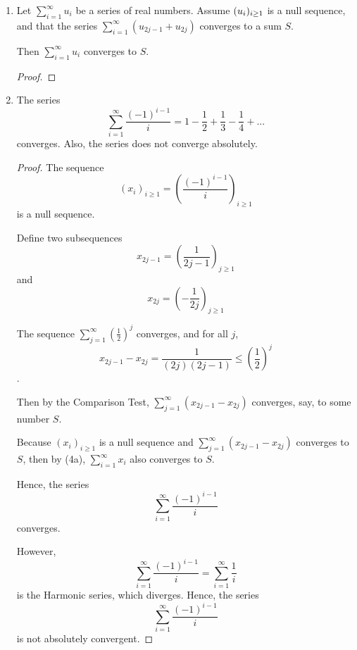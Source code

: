 \documentclass[12pt, letterpaper]{article}
\begin{document}
\begin{enumerate}[label=\bfseries2\alph*)]

\item Let $\sum_{i=1}^{\infty} u_i$ be a series of real numbers. Assume 
$(u_i)_{i \geq 1}$ is a null sequence, and that the series $\sum_{i=1}^{\infty} (u_{2j-1} + u_{2j})$
converges to a sum $S$.

Then $\sum_{i=1}^{\infty} u_i$ converges to $S$.

\begin{proof}
	
	

\end{proof}

\item The series \[\sum_{i=1}^{\infty} \frac{(-1)^{i-1}}{i} = 1 - \frac{1}{2} 
+ \frac{1}{3} - \frac{1}{4} + ...\] converges. Also, the series does not converge
absolutely.

\begin{proof}
	The sequence \[ (x_i)_{i\geq1} = \left(\frac{(-1)^{i-1}}{i}\right)_{i\geq1}\] is a null sequence.

	Define two subsequences \[x_{2j-1} = \left(\frac{1}{2j-1}\right)_{j\geq1}\]
	and \[x_{2j} = \left(-\frac{1}{2j}\right)_{j\geq1}\]

	The sequence $\sum_{j=1}^{\infty} (\frac{1}{2})^j$ converges, and for all $j$,
	\[x_{2j-1} - x_{2j} = \frac{1}{(2j)(2j-1)} \leq \left(\frac{1}{2}\right)^j\].

	Then by the Comparison Test, $\sum_{j=1}^{\infty}(x_{2j-1} - x_{2j})$
	converges, say, to some number $S$. 

	Because $(x_i)_{i\geq1}$ is a null sequence and $\sum_{j=1}^{\infty}(x_{2j-1} - x_{2j})$ 
	converges to $S$, then by (4a), $\sum_{i=1}^{\infty} x_i$ also converges
	to $S$.

	Hence, the series \[\sum_{i=1}^{\infty} \frac{(-1)^{i-1}}{i} \] converges.

	However, \[\sum_{i=1}^{\infty} \frac{(-1)^{i-1}}{i} = \sum_{i=1}^{\infty} \frac{1}{i}\]
	is the Harmonic series, which diverges. Hence, the series
	\[\sum_{i=1}^{\infty} \frac{(-1)^{i-1}}{i} \] is not absolutely convergent.
\end{proof}
\end{enumerate}
\end{document}
